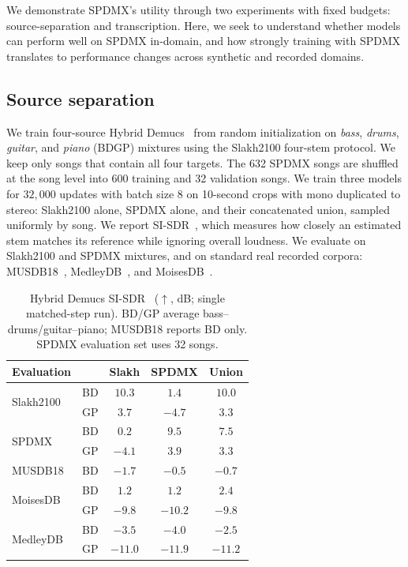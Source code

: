 \documentclass{article}
\begin{document}
We demonstrate SPDMX's utility through two experiments with fixed budgets: source-separation and transcription.
Here, we seek to understand whether models can perform well on SPDMX in-domain, and how strongly training with SPDMX translates to performance changes across synthetic and recorded domains.

\subsection{Source separation}
\label{ssec:separation}

We train four-source Hybrid Demucs~\cite{defossez2021hybrid} from random initialization on \emph{bass}, \emph{drums}, \emph{guitar}, and \emph{piano} (BDGP) mixtures using the Slakh2100 four-stem protocol.
We keep only songs that contain all four targets.
The 632 SPDMX songs are shuffled at the song level into 600 training and 32 validation songs.
We train three models for $32{,}000$ updates with batch size 8 on 10-second crops with mono duplicated to stereo: Slakh2100 alone, SPDMX alone, and their concatenated union, sampled uniformly by song.
We report SI-SDR~\cite{leroux2019sdr}, which measures how closely an estimated stem matches its reference while ignoring overall loudness.
We evaluate on Slakh2100 and SPDMX mixtures, and on standard real recorded corpora: MUSDB18~\cite{rafii2019musdb18}, MedleyDB~\cite{bittner2014medleydb,bittner2016medleydb}, and MoisesDB~\cite{pereira2023moisesdb}.

\begin{table}[t]
\centering
\setlength{\tabcolsep}{4pt}
\caption{Hybrid Demucs SI-SDR~\cite{leroux2019sdr} ($\uparrow$, dB; single matched-step run).
BD/GP average bass--drums/guitar--piano; MUSDB18 reports BD only.
SPDMX evaluation set uses 32 songs.}
\label{tab:separation}
\small
\begin{tabular}{@{}llccc@{}}
\toprule
\textbf{Evaluation} & & \textbf{Slakh} & \textbf{SPDMX} & \textbf{Union} \\
\midrule
\multirow{2}{*}{Slakh2100}
  & BD & $\mathbf{10.3}$ & $1.4$ & $10.0$ \\
  & GP & $\mathbf{3.7}$ & $-4.7$ & $3.3$ \\
\midrule
\multirow{2}{*}{SPDMX}
  & BD & $0.2$ & $\mathbf{9.5}$ & $7.5$ \\
  & GP & $-4.1$ & $\mathbf{3.9}$ & $3.3$ \\
\midrule
MUSDB18
  & BD & $-1.7$ & $\mathbf{-0.5}$ & $-0.7$ \\
\midrule
\multirow{2}{*}{MoisesDB}
  & BD & $1.2$ & $1.2$ & $\mathbf{2.4}$ \\
  & GP & $\mathbf{-9.8}$ & $-10.2$ & $\mathbf{-9.8}$ \\
\midrule
\multirow{2}{*}{MedleyDB}
  & BD & $-3.5$ & $-4.0$ & $\mathbf{-2.5}$ \\
  & GP & $\mathbf{-11.0}$ & $-11.9$ & $-11.2$ \\
\bottomrule
\end{tabular}
\end{table}
\end{document}
